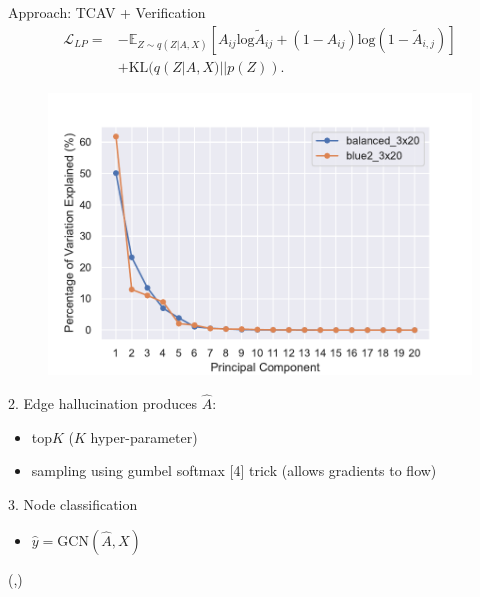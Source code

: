 \documentclass[final]{beamer}
\begin{document}
\begin{frame}[fragile]{}
\begin{textblock}{\colwidth}
\begin{paddedBlock}{Approach: TCAV + Verification}
\begin{align*}
\mathcal{L}_{LP}=&-\mathbb{E}_{Z\sim q(Z|A,X)}[A_{ij}\mathrm{log}\tilde{A}_{ij}+(1-A_{ij})\mathrm{log}(1-\tilde{A}_{i,j})]\\
&+\mathrm{KL}(q(Z|A,X)||p(Z)).
\end{align*}
\begin{figure}
    \centering
    \includegraphics[width=.8\textwidth]{img/scree_plot}
    \label{fig:big}
\end{figure}
\alert{2. Edge hallucination}
  produces $\hat{A}$:
  \begin{itemize}
    \item top$K$ ($K$ hyper-parameter)
    \item sampling using gumbel softmax [4] trick (allows gradients to flow)
  \end{itemize}
\alert{3. Node classification}
\begin{itemize}
	\item $\hat{y} = \mathrm{GCN}(\hat{A}, X)$
\end{itemize}

\end{paddedBlock}
\end{textblock}


\begin{textblock}{\colwidth}(\thirdcolpos,\vstartCols)





\end{textblock}
\end{frame}
\end{document}
